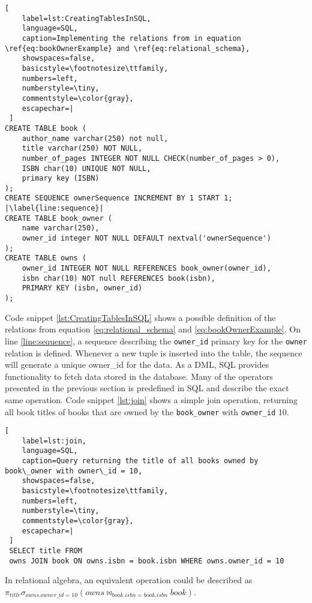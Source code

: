 \begin{lstlisting}[
    label=lst:CreatingTablesInSQL,
    language=SQL,
    caption=Implementing the relations from in equation \ref{eq:bookOwnerExample} and \ref{eq:relational_schema},
    showspaces=false,
    basicstyle=\footnotesize\ttfamily,
    numbers=left,
    numberstyle=\tiny,
    commentstyle=\color{gray},
    escapechar=|
 ]
CREATE TABLE book (
    author_name varchar(250) not null,
    title varchar(250) NOT NULL,
    number_of_pages INTEGER NOT NULL CHECK(number_of_pages > 0),
    ISBN char(10) UNIQUE NOT NULL,
    primary key (ISBN)
);
CREATE SEQUENCE ownerSequence INCREMENT BY 1 START 1; |\label{line:sequence}|
CREATE TABLE book_owner (
    name varchar(250),
    owner_id integer NOT NULL DEFAULT nextval('ownerSequence')
);
CREATE TABLE owns (
    owner_id INTEGER NOT NULL REFERENCES book_owner(owner_id),
    isbn char(10) NOT null REFERENCES book(isbn),
    PRIMARY KEY (isbn, owner_id)
);
\end{lstlisting}

Code snippet \ref{lst:CreatingTablesInSQL} shows a possible definition of the relations from equation \ref{eq:relational_schema} and \ref{eq:bookOwnerExample}.
On line \ref{line:sequence}, a sequence describing the \texttt{owner\_id} primary key for the \texttt{owner} relation is defined.
Whenever a new tuple is inserted into the table, the sequence will generate a unique owner\_id for the data.
As a DML, SQL provides functionality to fetch data stored in the database\cite{DBSBook}. 
Many of the operators presented in the previous section is predefined in SQL and describe the exact same operation\cite{DBSBook}.
Code snippet \ref{lst:join} shows a simple join operation, returning all book titles of books that are owned by the \texttt{book\_owner} with \texttt{owner\_id} 10.

\begin{lstlisting}[
    label=lst:join,
    language=SQL,
    caption=Query returning the title of all books owned by book\_owner with owner\_id = 10,
    showspaces=false,
    basicstyle=\footnotesize\ttfamily,
    numbers=left,
    numberstyle=\tiny,
    commentstyle=\color{gray},
    escapechar=|
 ]
 SELECT title FROM
 owns JOIN book ON owns.isbn = book.isbn WHERE owns.owner_id = 10  
\end{lstlisting}

In relational algebra, an equivalent operation could be described as \\$\pi_{title}\sigma_{owns.owner\_id = 10}(owns \Join_{book.isbn = book.isbn} book )$.

